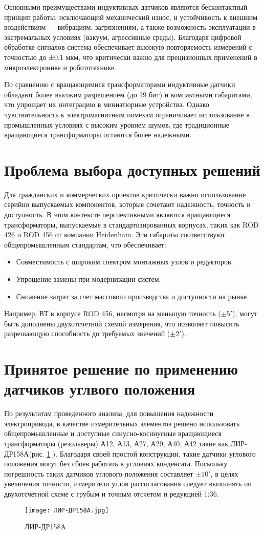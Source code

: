 Основными преимуществами индуктивных датчиков являются бесконтактный принцип работы, исключающий механический износ, и устойчивость к внешним воздействиям — вибрациям, загрязнениям, 
а также возможность эксплуатации в экстремальных условиях (вакуум, агрессивные среды). Благодаря цифровой обработке сигналов система обеспечивает высокую повторяемость измерений 
с точностью до ±0.1 мкм, что критически важно для прецизионных применений в микроэлектронике и робототехнике.

По сравнению с вращающимися трансформаторами индуктивные датчики обладают более высоким разрешением (до 19 бит) и компактными габаритами, что упрощает их интеграцию в миниатюрные устройства. 
Однако  чувствительность к электромагнитным помехам ограничивает использование в промышленных условиях с высоким уровнем шумов, где традиционные вращающиеся трансформаторы 
остаются более надежными.

\section{Проблема выбора доступных решений}
Для гражданских и коммерческих проектов критически важно использование серийно выпускаемых компонентов, которые сочетают надежность, точность и доступность. 
В этом контексте перспективными являются вращающиеся трансформаторы, выпускаемые в стандартизированных корпусах, таких как ROD 426 и ROD 456 от компании Heidenhain. 
Эти габариты соответствуют общепромышленным стандартам, что обеспечивает:

\begin{itemize} 
  \item Совместимость с широким спектром монтажных узлов и редукторов.
  \item Упрощение замены при модернизации систем.
  \item Снижение затрат за счет массового производства и доступности на рынке.
\end{itemize}

Например, ВТ в корпусе ROD 456, несмотря на меньшую точность ($ \pm 5'$), могут быть дополнены двухотсчетной схемой измерения, 
что позволяет повысить разрешающую способность до требуемых значений ($ \pm 2'$).
 \FloatBarrier
\section{Принятое решение по применению датчиков углвого положения}

По результатам проведенного анализа, для повышения надежности электропривода, в качестве измерительных элементов решено использовать общепромышленные и доступные 
синусно-косинусные вращающиеся трансформаторы (резольверы) А12, А13, А27, А29, А40, А42 такие как ЛИР-ДР158А(рис. \ref{LIR} ). Благодаря своей простой конструкции, 
такие датчики углового положения могут без сбоев работать в условиях конденсата. Поскольку погрешность таких датчиков углового положения составляет $ \pm 10'$, 
в целях увеличения точности, измерители углов рассогласования следует выполнять по двухотсчетной схеме с грубым и точным отсчетом и редукцией 1:36. 

  \begin{figure}[!h]
    \centering
    \texttt{[image: ЛИР-ДР158A.jpg]}
    \caption{ЛИР-ДР158A}
    \label{LIR}
  \end{figure}

   \FloatBarrier

  